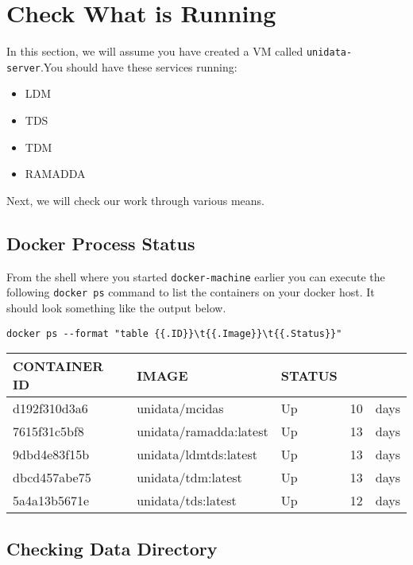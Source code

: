 \documentclass[onecolumn,9pt]{article}
\begin{document}
\section{\label{orgtarget4}Check What is Running}
\label{sec:orgheadline52}

In this section, we will assume you have created a VM called \texttt{unidata-server}.You should have these services running:

\begin{itemize}
\item LDM
\item TDS
\item TDM
\item RAMADDA
\end{itemize}

Next, we will check our work through various means.

\subsection{Docker Process Status}
\label{sec:orgheadline43}

From the shell where you started \texttt{docker-machine} earlier you can execute the following \texttt{docker ps} command to list the containers on your docker host. It should look something like the output below.

\begin{verbatim}
docker ps --format "table {{.ID}}\t{{.Image}}\t{{.Status}}"
\end{verbatim}

\begin{center}
\begin{tabular}{lllrl}
\hline
CONTAINER ID & IMAGE & STATUS &  & \\
\hline
d192f310d3a6 & unidata/mcidas & Up & 10 & days\\
7615f31c5bf8 & unidata/ramadda:latest & Up & 13 & days\\
9dbd4e83f15b & unidata/ldmtds:latest & Up & 13 & days\\
dbcd457abe75 & unidata/tdm:latest & Up & 13 & days\\
5a4a13b5671e & unidata/tds:latest & Up & 12 & days\\
\hline
\end{tabular}
\end{center}

\subsection{Checking Data Directory}
\label{sec:orgheadline44}
\end{document}
